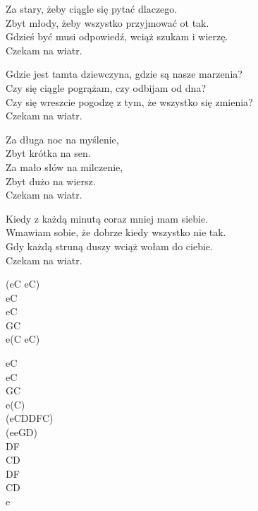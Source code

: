 \begin{text}

Za stary, żeby ciągle się pytać dlaczego.\\
Zbyt młody, żeby wszystko przyjmować ot tak.\\
Gdzieś być musi odpowiedź, wciąż szukam i wierzę.\\
Czekam na wiatr.

Gdzie jest tamta dziewczyna, gdzie są nasze marzenia?\\
Czy się ciągle pogrążam, czy odbijam od dna?\\
Czy się wreszcie pogodzę z tym, że wszystko się zmienia?\\
Czekam na wiatr.

\hfill\break
\vin Za długa noc na myślenie,\\
\vin Zbyt krótka na sen.\\
\vin Za mało słów na milczenie,\\
\vin Zbyt dużo na wiersz.\\
\vin Czekam na wiatr.

Kiedy z każdą minutą coraz mniej mam siebie.\\
Wmawiam sobie, że dobrze kiedy wszystko nie tak.\\
Gdy każdą struną duszy wciąż wołam do ciebie.\\
Czekam na wiatr.
\end{text}
\begin{chord}
\small{
    (eC eC)\\
    eC\\
    eC\\
    GC\\
    e(C eC)

    eC\\
    eC\\
    GC\\
    e(C)\\
    (eCDDFC)\\
    (eeGD)\\
    DF\\
    CD\\
    DF\\
    CD\\
    e}
\end{chord}